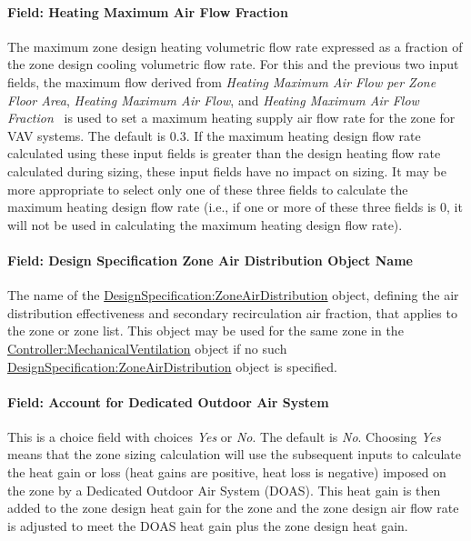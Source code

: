 \paragraph{Field: Heating Maximum Air Flow Fraction}\label{field-heating-maximum-air-flow-fraction}

The maximum zone design heating volumetric flow rate expressed as a fraction of the zone design cooling volumetric flow rate. For this and the previous two input fields, the maximum flow derived from \emph{Heating Maximum Air Flow per Zone Floor Area}, \emph{Heating Maximum Air Flow}, and \emph{Heating Maximum Air Flow Fraction}~ is used to set a maximum heating supply air flow rate for the zone for VAV systems. The default is 0.3. If the maximum heating design flow rate calculated using these input fields is greater than the design heating flow rate calculated during sizing, these input fields have no impact on sizing. It may be more appropriate to select only one of these three fields to calculate the maximum heating design flow rate (i.e., if one or more of these three fields is 0, it will not be used in calculating the maximum heating design flow rate).

\paragraph{Field: Design Specification Zone Air Distribution Object Name}\label{field-design-specification-zone-air-distribution-object-name}

The name of the \hyperref[designspecificationzoneairdistribution]{DesignSpecification:ZoneAirDistribution} object, defining the air distribution effectiveness and secondary recirculation air fraction, that applies to the zone or zone list. This object may be used for the same zone in the \hyperref[controllermechanicalventilation]{Controller:MechanicalVentilation} object if no such \hyperref[designspecificationzoneairdistribution]{DesignSpecification:ZoneAirDistribution} object is specified.

\paragraph{Field: Account for Dedicated Outdoor Air System}\label{field-account-for-dedicated-outdoor-air-system}

This is a choice field with choices \emph{Yes} or \emph{No}. The default is \emph{No}. Choosing \emph{Yes} means that the zone sizing calculation will use the subsequent inputs to calculate the heat gain or loss (heat gains are positive, heat loss is negative) imposed on the zone by a Dedicated Outdoor Air System (DOAS). This heat gain is then added to the zone design heat gain for the zone and the zone design air flow rate is adjusted to meet the DOAS heat gain plus the zone design heat gain.

